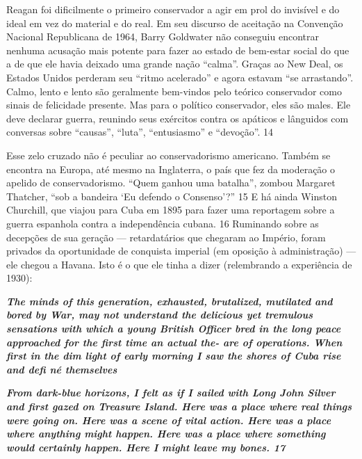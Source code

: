  
\par
 
Reagan foi dificilmente o primeiro conservador a agir em prol do invisível e do ideal em vez do material e do real. Em seu discurso de aceitação na Convenção Nacional Republicana de 1964, Barry Goldwater não conseguiu encontrar nenhuma acusação mais potente para fazer ao estado de bem-estar social do que a de que ele havia deixado uma grande nação “calma”. Graças ao New Deal, os Estados Unidos perderam seu “ritmo acelerado” e agora estavam “se arrastando”. Calmo, lento e lento são geralmente bem-vindos pelo teórico conservador como sinais de felicidade presente. Mas para o político conservador, eles são males. Ele deve declarar guerra, reunindo seus exércitos contra os apáticos e lânguidos com conversas sobre “causas”, “luta”, “entusiasmo” e “devoção”.
 {\color{blue} 14}  

 
\par
 
Esse zelo cruzado não é peculiar ao conservadorismo americano. Também se encontra na Europa, até mesmo na Inglaterra, o país que fez da moderação o apelido de conservadorismo. “Quem ganhou uma batalha”, zombou Margaret Thatcher, “sob a bandeira ‘Eu defendo o Consenso’?”
 {\color{blue} 15}  
E há ainda Winston Churchill, que viajou para Cuba em 1895 para fazer uma reportagem sobre a guerra espanhola contra a independência cubana.
 {\color{blue} 16}  
Ruminando sobre as decepções de sua geração — retardatários que chegaram ao Império, foram privados da oportunidade de conquista imperial (em oposição à administração) — ele chegou a Havana. Isto é o que ele tinha a dizer (relembrando a experiência de 1930):
 
\par
 

 \textbf{\textit{The minds of this generation, exhausted, brutalized, mutilated and bored by War, may not understand the delicious yet tremulous sensations with which a young British Officer bred in the long peace approached for the first time an actual the- are of operations. When first in the dim light of early morning I saw the shores of Cuba rise and defi né themselves} }  
 
 
\par
 

 
\par
 

 \textbf{\textit{From dark-blue horizons, I felt as if I sailed with Long John Silver and first gazed on Treasure Island. Here was a place where real things were going on. Here was a scene of vital action. Here was a place where anything might happen. Here was a place where something would certainly happen. Here I might leave my bones. {{\color{blue} 17} } } }  
 
